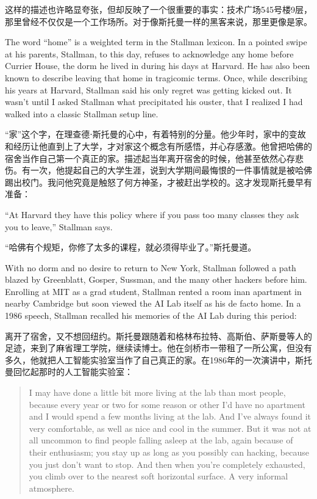 \ifdefined\chs
这样的描述也许略显夸张，但却反映了一个很重要的事实：技术广场545号楼9层，那里曾经不仅仅是一个工作场所。对于像斯托曼一样的黑客来说，那里更像是家。
\fi

\ifdefined\eng
The word ``home'' is a weighted term in the Stallman lexicon. In a pointed swipe at his parents, Stallman, to this day, refuses to acknowledge any home before Currier House, the dorm he lived in during his days at Harvard. He has also been known to describe leaving that home in tragicomic terms. Once, while describing his years at Harvard, Stallman said his only regret was getting kicked out. It wasn't until I asked Stallman what precipitated his ouster, that I realized I had walked into a classic Stallman setup line.
\fi

\ifdefined\chs
``家''这个字，在理查德⋅斯托曼的心中，有着特别的分量。他少年时，家中的变故和经历让他直到上了大学，才对家这个概念有所感悟，并心存感激。他曾把哈佛的宿舍当作自己第一个真正的家。描述起当年离开宿舍的时候，他甚至依然心存悲伤。有一次，他提起自己的大学生涯，说到大学期间最悔恨的一件事情就是被哈佛踢出校门。我问他究竟是触怒了何方神圣，才被赶出学校的。这才发现斯托曼早有准备：
\fi

\ifdefined\eng
``At Harvard they have this policy where if you pass too many classes they ask you to leave,'' Stallman says.
\fi

\ifdefined\chs
``哈佛有个规矩，你修了太多的课程，就必须得毕业了。''斯托曼道。
\fi

\ifdefined\eng
With no dorm and no desire to return to New York, Stallman followed a path blazed by Greenblatt, Gosper, Sussman, and the many other hackers before him. Enrolling at MIT as a grad student, Stallman rented \ifdefined\vtwo a room in\fi an apartment in nearby Cambridge but soon viewed the AI Lab itself as his de facto home. In a 1986 speech, Stallman recalled his memories of the AI Lab during this period:
\fi

\ifdefined\chs
离开了宿舍，又不想回纽约。斯托曼跟随着和格林布拉特、高斯伯、萨斯曼等人的足迹，来到了麻省理工学院，继续读博士。他在剑桥市一带租了一所公寓，但没有多久，他就把人工智能实验室当作了自己真正的家。在1986年的一次演讲中，斯托曼回忆起那时的人工智能实验室：
\fi

\ifdefined\eng
\begin{quote}
I may have done a little bit more living at the lab than most people, because every year or two for some reason or other I'd have no apartment and I would spend a few months living at the lab. And I've always found it very comfortable, as well as nice and cool in the summer. But it was not at all uncommon to find people falling asleep at the lab, again because of their enthusiasm; you stay up as long as you possibly can hacking, because you just don't want to stop. And then when you're completely exhausted, you climb over to the nearest soft horizontal surface. A very informal atmosphere.
\end{quote}
\fi

